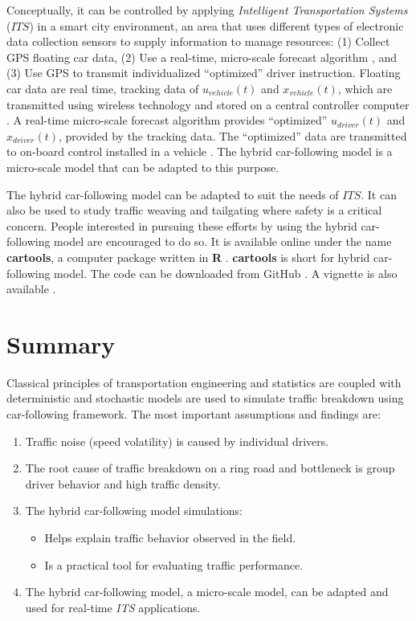 \documentclass[Proceedings]{ascelike}
\begin{document}
 Conceptually, it can be controlled  by applying \emph{Intelligent Transportation Systems} ($ITS$) in a smart city environment, an area that uses different types of electronic data collection sensors to supply information to manage resources: (1) Collect GPS floating car data, (2) Use a real-time, micro-scale forecast algorithm \cite{trieber}, and (3) Use GPS to transmit individualized ``optimized'' driver instruction. Floating car data are  real time, tracking data of $u_{vehicle}(t)$ and  $x_{vehicle}(t)$, which are transmitted using wireless technology and stored on a central controller computer \cite{tarnoff}. A real-time micro-scale forecast algorithm provides ``optimized'' $u_{driver}(t)$ and  $x_{driver}(t)$, provided by the tracking data. The ``optimized'' data are transmitted to on-board control installed in a vehicle \cite{5gaa}. The hybrid car-following model is a  micro-scale model that can be adapted to this purpose. 
 
 The hybrid car-following model can be adapted to suit the needs of $ITS$. It can also be used to study traffic weaving and tailgating where  safety is a critical concern. People interested in pursuing these efforts by using the hybrid car-following model are encouraged to do so. It is available online under the name \textbf{cartools}, a computer package written in \textbf{R}  \cite{cran}.   \textbf{cartools} is short for hybrid car-following model. The  code can be downloaded from GitHub  \cite{pjo2018}. A vignette is also available \cite{cartools}. 




\section{Summary}

Classical principles of transportation engineering and statistics are coupled with deterministic and stochastic models are used to simulate traffic breakdown  using car-following framework. The most important assumptions and findings are:


\begin{enumerate}
\item Traffic noise (speed volatility) is caused by individual drivers.
\item The root cause of traffic breakdown on a ring road and bottleneck is group driver behavior and high traffic density.
\item The hybrid car-following model simulations:
\begin{itemize}
\item Helps explain traffic behavior observed in the field.
\item Is a practical tool for evaluating traffic performance.
\end{itemize}
\item The hybrid car-following model, a micro-scale model,  can be adapted and used for real-time \emph{ITS} applications.
\end{enumerate}
\end{document}
